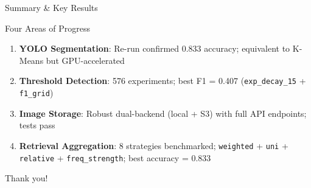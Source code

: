\documentclass[aspectratio=169,11pt]{beamer}
\begin{document}
\begin{frame}{Summary \& Key Results}
  \begin{block}{Four Areas of Progress}
    \begin{enumerate}
      \item \textbf{YOLO Segmentation}: Re-run confirmed 0.833 accuracy; equivalent to K-Means but GPU-accelerated
      \item \textbf{Threshold Detection}: 576 experiments; best F1 = 0.407 (\texttt{exp\_decay\_15} + \texttt{f1\_grid})
      \item \textbf{Image Storage}: Robust dual-backend (local + S3) with full API endpoints; tests pass
      \item \textbf{Retrieval Aggregation}: 8 strategies benchmarked; \texttt{weighted} + \texttt{uni} + \texttt{relative} + \texttt{freq\_strength}; best accuracy = 0.833
    \end{enumerate}
  \end{block}

  \begin{center}
    \Large \alert{Thank you!}
  \end{center}
\end{frame}
\end{document}
